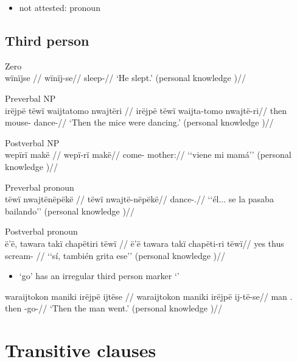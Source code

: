 \documentclass{memoir}
\begin{document}
\begin{itemize}
\tightlist
\item
  not attested: pronoun
\end{itemize}

\subsection{Third person}

\ex  Zero  \\\label{ctorat-6}
\begingl \glpreamble wïnïjse //
\gla wïnïj-se//
\glb sleep-//
\glft ‘He slept.’ (personal knowledge
)//
\endgl
\xe

\ex  Preverbal NP  \\\label{ctorat-16}
\begingl \glpreamble irëjpë tëwï waijtatomo nwajtëri //
\gla irëjpë tëwï waijta-tomo nwajtë-ri//
\glb then  mouse- dance-//
\glft ‘Then the mice were dancing.’ (personal knowledge
)//
\endgl
\xe

\ex  Postverbal NP  \\\label{histgrme-83}
\begingl \glpreamble wepïrï makë //
\gla wepï-rï makë//
\glb come- mother://
\glft ‘‘viene mi mamá’’ (personal knowledge
)//
\endgl
\xe

\ex  Preverbal pronoun  \\\label{desccasagrme-28}
\begingl \glpreamble tëwï nwajtënëpëkë //
\gla tëwï nwajtë-nëpëkë//
\glb {} dance-.//
\glft ‘‘él... se la pasaba bailando’’ (personal knowledge
)//
\endgl
\xe

\ex  Postverbal pronoun  \\\label{convfemgrme-113}
\begingl \glpreamble ë'ë, tawara takï chapëtiri tëwï //
\gla ë'ë tawara takï chapëti-ri tëwï//
\glb yes thus  scream- //
\glft ‘‘sí, también grita ese’’ (personal knowledge
)//
\endgl
\xe

\begin{itemize}
\tightlist
\item
   `go' has an irregular third person marker  `'
\end{itemize}

\ex \label{ctorat-45}
\begingl \glpreamble waraijtokon maniki irëjpë ijtëse //
\gla waraijtokon maniki irëjpë ij-të-se//
\glb man . then -go-//
\glft ‘Then the man went.’ (personal knowledge
)//
\endgl
\xe

\section{Transitive clauses}
\end{document}
